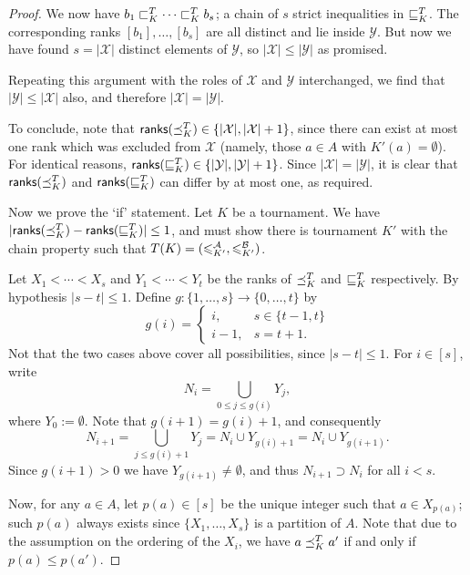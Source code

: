\begin{proof}
    We now have $b_1 \sqsubset_K^T \cdots \sqsubset_K^T b_s$; a chain of $s$ strict
    inequalities in $\sqsubseteq_K^T$. The corresponding ranks $[b_1], \ldots,
    [b_s]$ are all distinct and lie inside $\mathcal{Y}$. But now we have found
    $s = |\mathcal{X}|$ distinct elements of $\mathcal{Y}$, so $|\mathcal{X}|
    \le |\mathcal{Y}|$ as promised.

    Repeating this argument with the roles of $\mathcal{X}$ and $\mathcal{Y}$
    interchanged, we find that $|\mathcal{Y}| \le |\mathcal{X}|$ also, and
    therefore $|\mathcal{X}| = |\mathcal{Y}|$.

    To conclude, note that $\mathsf{ranks}({\preceq_K^T}) \in \{|\mathcal{X}|,
    |\mathcal{X}| + 1\}$, since there can exist at most one rank which was
    excluded from $\mathcal{X}$ (namely, those $a \in A$ with $K'(a) =
    \emptyset$). For identical reasons, $\mathsf{ranks}({\sqsubseteq_K^T}) \in
    \{|\mathcal{Y}|, |\mathcal{Y}| + 1\}$. Since $|\mathcal{X}| =
    |\mathcal{Y}|$, it is clear that $\mathsf{ranks}({\preceq_K^T})$ and
    $\mathsf{ranks}({\sqsubseteq_K^T})$ can differ by at most one, as required.

    Now we prove the `if' statement. Let $K$ be a tournament. We have
    $|\mathsf{ranks}({\preceq_K^T}) - \mathsf{ranks}({\sqsubseteq_K^T})| \le 1$, and must show there is
    tournament $K'$ with the chain property such that $T(K) = ({\leqslant^{\mathcal{A}}_{K'}},
    {\leqslant^{\mathcal{B}}_{K'}})$.

    Let $X_1 < \cdots < X_s$ and $Y_1 < \cdots < Y_t$ be the ranks of
    $\preceq_K^T$ and $\sqsubseteq_K^T$ respectively. By hypothesis $|s - t| \le
    1$. Define $g: \{1,\ldots,s\} \to \{0,\ldots,t\}$ by
    \[
        g(i) = \begin{cases}
            i,& s \in \{t-1, t\} \\
            i - 1,& s = t + 1.
        \end{cases}
    \]
    Not that the two cases above cover all possibilities, since $|s - t| \le
    1$. For $i \in [s]$, write
    \[
        N_i = \bigcup_{0 \le j \le g(i)}{Y_j},
    \]
    where $Y_0 := \emptyset$. Note that $g(i+1) = g(i) + 1$, and consequently
    \[
        N_{i+1}
        = \bigcup_{j \le g(i) + 1}{Y_j}
        = N_i \cup Y_{g(i) + 1}
        = N_i \cup Y_{g(i + 1)}.
    \]
    Since $g(i+1) > 0$ we have $Y_{g(i+1)} \ne \emptyset$, and thus $N_{i+1}
    \supset N_i$ for all $i < s$.

    Now, for any $a \in A$, let $p(a) \in [s]$ be the unique integer such that
    $a \in X_{p(a)}$; such $p(a)$ always exists since $\{X_1,\ldots,X_s\}$ is a
    partition of $A$. Note that due to the assumption on the ordering of the
    $X_i$, we have $a \preceq_K^T a'$ if and only if $p(a) \le p(a')$.


\end{proof}
